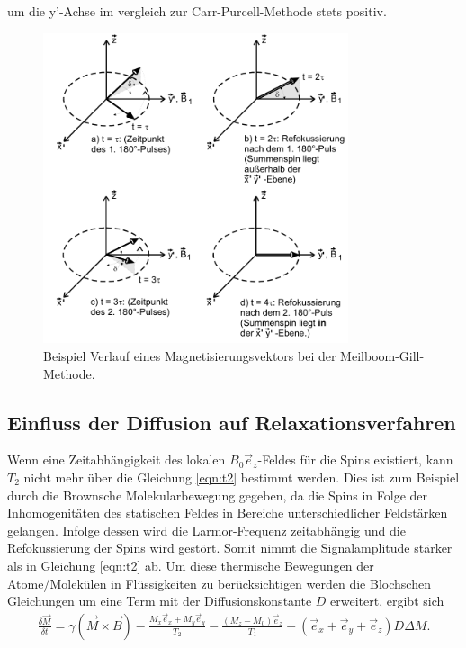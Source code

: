 \begin{itemize}
um die y'-Achse im vergleich zur Carr-Purcell-Methode stets positiv.
\begin{figure}
  \includegraphics[width=0.8\textwidth]{mei-gil.PNG}
  \caption{Beispiel Verlauf eines Magnetisierungsvektors bei
  der Meilboom-Gill-Methode.}
  \label{fig:mei-gil}
\end{figure}
\end{itemize}

\subsection{Einfluss der Diffusion auf Relaxationsverfahren}
Wenn eine Zeitabhängigkeit des lokalen
$B_0\vec{e}_z$-Feldes für die Spins existiert, kann $T_2$ nicht mehr über die Gleichung
\eqref{eqn:t2} bestimmt werden. Dies ist zum Beispiel
durch die Brownsche Molekularbewegung gegeben, da
die Spins in Folge der Inhomogenitäten des statischen Feldes
in Bereiche unterschiedlicher Feldstärken gelangen.
Infolge dessen wird die Larmor-Frequenz zeitabhängig
und die Refokussierung der Spins wird gestört.
Somit nimmt die
Signalamplitude stärker als in Gleichung \eqref{eqn:t2}
ab.
Um diese thermische Bewegungen der Atome/Molekülen
in Flüssigkeiten zu berücksichtigen
werden die Blochschen Gleichungen um eine Term mit der
Diffusionskonstante $D$ erweitert, ergibt sich
\begin{align}
\frac{\delta\vec{M}}{\delta t} = \gamma\left(\vec{M}\times\vec{B}\right)-\frac{M_x\vec{e}_x+M_y\vec{e}_y}{T_2}-\frac{\left(M_z-M_0\right)\vec{e}_z}{T_1} +(\vec{e}_x+\vec{e}_y+\vec{e}_z)D\Delta M.
\end{align}




